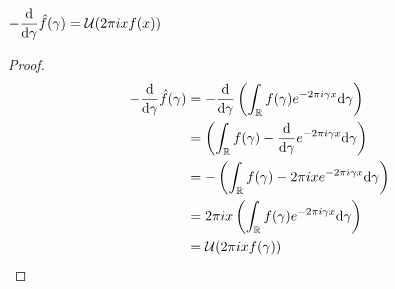 $\displaystyle - \dv{\gamma} \hat{f}(\gamma) = \mathcal{U}(2\pi i x f(x))$
\begin{proof}
    \begin{align*}
        - \dv{\gamma} \hat{f}(\gamma) &=  - \dv{\gamma}  \pars{ \intreal f(\gamma) e^{-2 \pi i \gamma x} \dd \gamma}\\
        &= \pars{ \intreal f(\gamma) - \dv{\gamma} e^{-2 \pi i \gamma x} \dd \gamma}\\
        &= -\pars{ \intreal f(\gamma) -2 \pi ix e^{-2 \pi i \gamma x} \dd \gamma}\\
        &=  2 \pi ix \pars{ \intreal f(\gamma) e^{-2 \pi i \gamma x}\dd \gamma}\\
        &= \mcu(2\pi i x f(\gamma))
    \end{align*}
\end{proof}